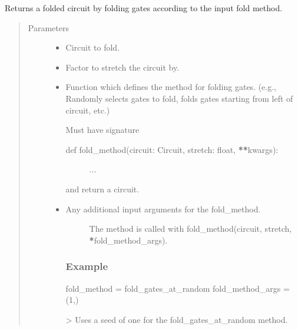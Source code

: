 \documentclass[letterpaper,10pt,english]{sphinxmanual}
\begin{document}
\begin{fulllineitems}
\label{\detokenize{index:mitiq.folding_cirq.fold_local}}
Returns a folded circuit by folding gates according to the input fold method.
\begin{quote}\begin{description}
\item[{Parameters}] \leavevmode\begin{itemize}
\item {} 
 \sphinxhyphen{}\sphinxhyphen{} Circuit to fold.

\item {} 
 \sphinxhyphen{}\sphinxhyphen{} Factor to stretch the circuit by.

\item {} 
 \sphinxhyphen{}\sphinxhyphen{} 
Function which defines the method for folding gates.
(e.g., Randomly selects gates to fold, folds gates starting from left of circuit, etc.)

Must have signature
\begin{description}
\item[{def fold\_method(circuit: Circuit, stretch: float, {\color{red}\bfseries{}**}kwargs):}] \leavevmode
...

\end{description}

and return a circuit.


\item {} 
 \sphinxhyphen{}\sphinxhyphen{} \begin{description}
\item[{Any additional input arguments for the fold\_method.}] \leavevmode
The method is called with fold\_method(circuit, stretch, {\color{red}\bfseries{}*}fold\_method\_args).

\end{description}
\subsubsection*{Example}

fold\_method = fold\_gates\_at\_random
fold\_method\_args = (1,)

\textgreater{} Uses a seed of one for the fold\_gates\_at\_random method.


\end{itemize}

\end{description}\end{quote}

\end{fulllineitems}
\end{document}
